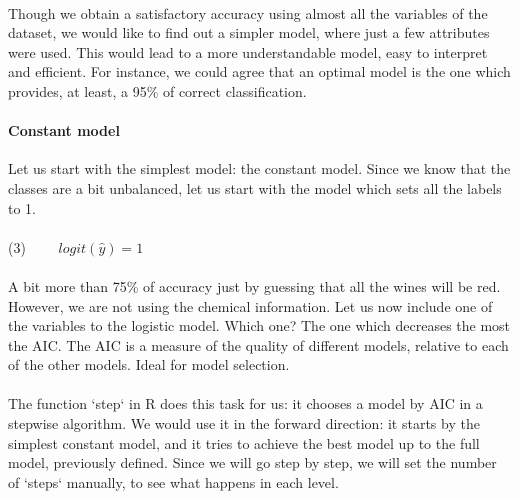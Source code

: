 \documentclass[10pt]{article}
\begin{document}
\paragraph*{}
Though we obtain a satisfactory accuracy using almost all the variables of the dataset, we would like to find out a simpler model, where just a few attributes were used. This would lead to a more understandable model, easy to interpret and efficient. For instance, we could agree that an optimal model is the one which provides, at least, a 95\% of correct classification.


\paragraph{Constant model}	

Let us start with the simplest model: the constant model. Since we know that the classes are a bit unbalanced, let us start with the model which sets all the labels to 1.

\paragraph*{}
(3) \ \ \ \  $logit(\hat{y}) = 1$

\paragraph*{}
A bit more than 75\% of accuracy just by guessing that all the wines will be red. However, we are not using the chemical information. Let us now include one of the variables to the logistic model. Which one? The one which decreases the most the AIC. The AIC is a measure of the quality of different models, relative to each of the other models. Ideal for model selection.

\paragraph*{}
The function `step` in R does this task for us: it chooses a model by AIC in a stepwise algorithm. We would use it in the forward direction: it starts by the simplest constant model, and it tries to achieve the best model up to the full model, previously defined. Since we will go step by step, we will set the number of `steps` manually, to see what happens in each level.
\end{document}
